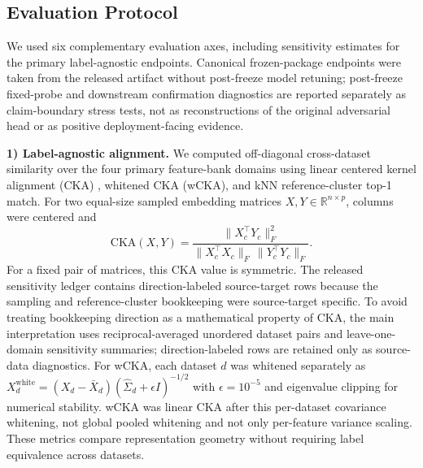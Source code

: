 \documentclass[journal]{IEEEtran}
\begin{document}
\subsection{Evaluation Protocol}
We used six complementary evaluation axes, including sensitivity estimates for the primary label-agnostic endpoints. Canonical frozen-package endpoints were taken from the released artifact without post-freeze model retuning; post-freeze fixed-probe and downstream confirmation diagnostics are reported separately as claim-boundary stress tests, not as reconstructions of the original adversarial head or as positive deployment-facing evidence.

\textbf{1) Label-agnostic alignment.} We computed off-diagonal cross-dataset similarity over the four primary feature-bank domains using linear centered kernel alignment (CKA) \cite{kornblith2019cka}, whitened CKA (wCKA), and kNN reference-cluster top-1 match. For two equal-size sampled embedding matrices $X,Y\in\mathbb{R}^{n\times p}$, columns were centered and
\begin{equation}
\mathrm{CKA}(X,Y)=\frac{\|X_c^\top Y_c\|_F^2}{\|X_c^\top X_c\|_F\,\|Y_c^\top Y_c\|_F}.
\end{equation}
For a fixed pair of matrices, this CKA value is symmetric. The released sensitivity ledger contains direction-labeled source-target rows because the sampling and reference-cluster bookkeeping were source-target specific. To avoid treating bookkeeping direction as a mathematical property of CKA, the main interpretation uses reciprocal-averaged unordered dataset pairs and leave-one-domain sensitivity summaries; direction-labeled rows are retained only as source-data diagnostics. For wCKA, each dataset $d$ was whitened separately as $X_d^{\mathrm{white}}=(X_d-\bar{X}_d)(\hat{\Sigma}_d+\epsilon I)^{-1/2}$ with $\epsilon=10^{-5}$ and eigenvalue clipping for numerical stability. wCKA was linear CKA after this per-dataset covariance whitening, not global pooled whitening and not only per-feature variance scaling. These metrics compare representation geometry without requiring label equivalence across datasets.
\end{document}
